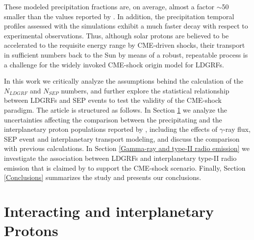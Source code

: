 \documentclass{aastex61}
\begin{document}
These modeled precipitation fractions
are, on average, almost a factor $\sim$50 smaller than the values 
reported by \citet{ref:DENOLFO2019}.
In addition, the precipitation temporal profiles assessed with the simulations exhibit a much faster decay with respect to experimental observations. Thus, 
although solar protons are believed to be accelerated to the requisite energy range by CME-driven shocks, their transport in sufficient numbers back to the Sun by means of a robust, repeatable  process is a challenge for the widely invoked CME-shock origin model for LDGRFs.


In this work we critically analyze the assumptions behind the calculation of the $N_{LDGRF}$ and $N_{SEP}$ numbers, and further explore the statistical relationship between 
LDGRFs and SEP events to test the validity of the CME-shock paradigm.
The article is structured as follows. In Section \ref{Interacting and interplanetary Protons} we analyze the uncertainties affecting the comparison between the precipitating and the interplanetary proton populations reported by \citet{ref:DENOLFO2019}, including the effects of $\gamma$-ray flux, SEP event and interplanetary transport modeling, and discuss the comparison with previous calculations. In Section \ref{Gamma-ray and type-II radio emission} we investigate the association between LDGRFs and interplanetary type-II radio emission
that is claimed by \citet{ref:GOPALSWAMY2018b} to support the CME-shock scenario. Finally, Section \ref{Conclusions} summarizes
the study and presents our conclusions.

%
%
%
%
\section{Interacting and interplanetary Protons}\label{Interacting and interplanetary Protons}
%
%
%
%
\end{document}
